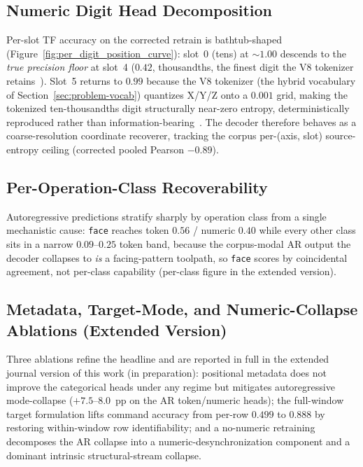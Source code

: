 \documentclass[conference]{IEEEtran}
\begin{document}
\subsection{Numeric Digit Head Decomposition}
\label{sec:numeric-decomposition}

Per-slot TF accuracy on the corrected retrain is bathtub-shaped (Figure~\ref{fig:per_digit_position_curve}): slot~0 (tens) at $\sim\!1.00$ descends to the \emph{true precision floor} at slot~4 ($0.42$, thousandths, the finest digit the V8 tokenizer retains~\cite{paperB_entropy}). Slot~5 returns to $0.99$ because the V8 tokenizer (the hybrid vocabulary of Section~\ref{sec:problem-vocab}) quantizes X/Y/Z onto a $0.001$ grid, making the tokenized ten-thousandths digit structurally near-zero entropy, deterministically reproduced rather than information-bearing~\cite{paperB_entropy}. The decoder therefore behaves as a coarse-resolution coordinate recoverer, tracking the corpus per-(axis, slot) source-entropy ceiling (corrected pooled Pearson $-0.89$).

\subsection{Per-Operation-Class Recoverability}
\label{sec:per-op-class}

Autoregressive predictions stratify sharply by operation class from a single mechanistic cause: \texttt{face} reaches token $0.56$ / numeric $0.40$ while every other class sits in a narrow $0.09$--$0.25$ token band, because the corpus-modal AR output the decoder collapses to \emph{is} a facing-pattern toolpath, so \texttt{face} scores by coincidental agreement, not per-class capability (per-class figure in the extended version).

\subsection{Metadata, Target-Mode, and Numeric-Collapse Ablations (Extended Version)}
\label{sec:results-rq2}

Three ablations refine the headline and are reported in full in the extended journal version of this work (in preparation): positional metadata does not improve the categorical heads under any regime but mitigates autoregressive mode-collapse ($+7.5$--$8.0$~pp on the AR token/numeric heads); the full-window target formulation lifts command accuracy from per-row $0.499$ to $0.888$ by restoring within-window row identifiability; and a no-numeric retraining decomposes the AR collapse into a numeric-desynchronization component and a dominant intrinsic structural-stream collapse.
\end{document}
